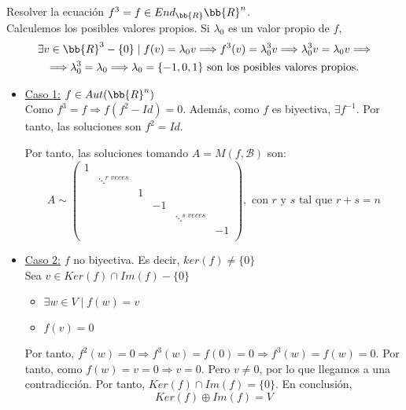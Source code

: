 \begin{ejercicio}
    Resolver la ecuación $f^3=f \in End_\bb{R}\bb{R}^n$.\\
    
    Calculemos los posibles valores propios. Si $\lambda_0$ es un valor propio de $f$,
    \begin{multline*}
        \exists v\in \bb{R}^3-\{0\} \mid f(v) = \lambda_0 v \Longrightarrow f^3(v) = \lambda_0^3v\Longrightarrow \lambda_0^3v=\lambda_0v
        \Longrightarrow \\ \Longrightarrow
        \lambda_0^3 = \lambda_0 \Longrightarrow \lambda_0 = \{-1,0,1\} \text{ son los posibles valores propios.}
    \end{multline*}
    \begin{itemize}
        \item \underline{Caso 1:} $f\in Aut(\bb{R}^n)$\\
        Como $f^3 = f\Longrightarrow f(f^2-Id) = 0$. Además, como $f$ es biyectiva, $\exists f^{-1}$. Por tanto, las soluciones son $f^2=Id$.
        
        Por tanto, las soluciones tomando $A=M(f, \mathcal{B})$ son:
        \begin{equation*}
            A\sim \left(\begin{array}{cccccc}
                1&&&&&\\
                &\ddots^{r\;veces}&&&&\\
                &&1&&&\\
                &&&-1&&\\
                &&&&\ddots^{s\;veces}&\\
                &&&&&-1\\
            \end{array} \right), \text{ con $r$ y $s$ tal que $r+s=n$}
        \end{equation*}

        \item \underline{Caso 2:} $f$ no biyectiva. Es decir, $ker(f)\neq \{0\}$\\
        Sea $v\in Ker(f)\cap Im(f) -\{0\}$
        \begin{itemize}
            \item $\exists w \in V \mid f(w) = v$
            \item $f(v)=0$
        \end{itemize}
        Por tanto, $f^2(w)=0 \Longrightarrow f^3(w) = f(0) = 0 \Longrightarrow f^3(w) = f(w) = 0$. Por tanto, como $f(w)=v=0 \Longrightarrow v=0$. Pero $v\neq 0$, por lo que llegamos a una contradicción. Por tanto, $Ker(f)\cap Im(f)=\{0\}$. En conclusión,
        $$Ker(f)\oplus Im(f) = V$$


\end{itemize}
\end{ejercicio}
